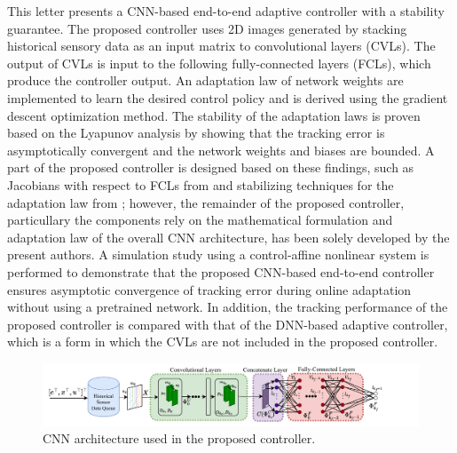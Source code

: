 \documentclass[letterpaper, 10 pt, conference]{ieeeconf}  %
\begin{document}
This letter presents a CNN-based end-to-end adaptive controller with a stability guarantee.
The proposed controller uses 2D images generated by stacking historical sensory data as an input matrix to convolutional layers (CVLs). The output of CVLs is input to the following fully-connected layers (FCLs), which produce the controller output. An adaptation law of network weights are implemented to learn the desired control policy and is derived using the gradient descent optimization method. 
The stability of the adaptation laws is proven based on the Lyapunov analysis by showing that the tracking error is asymptotically convergent and the network weights and biases are bounded. 
A part of the proposed controller is designed based on these findings, such as Jacobians with respect to FCLs from \cite{DixonDNN} and stabilizing techniques for the adaptation law from \cite{BoockEKestimation,BookEKcontrol}; however, the remainder of the proposed controller, particullary the components rely on the mathematical formulation and adaptation law of the overall CNN architecture, has been solely developed by the present authors.
A simulation study using a control-affine nonlinear system is performed to demonstrate that the proposed CNN-based end-to-end controller ensures asymptotic convergence of tracking error during online adaptation without using a pretrained network. 
In addition, the tracking performance of the proposed controller is compared with that of the DNN-based adaptive controller, which is a form in which the CVLs are not included in the proposed controller.

\begin{figure}[!t]
    \centering
    \includegraphics[width=2.2\columnwidth]{CNNatrl_new.drawio.pdf}
    \caption{CNN architecture used in the proposed controller. 
    } 
    \label{fig: CNN structure}
\end{figure}
\end{document}

